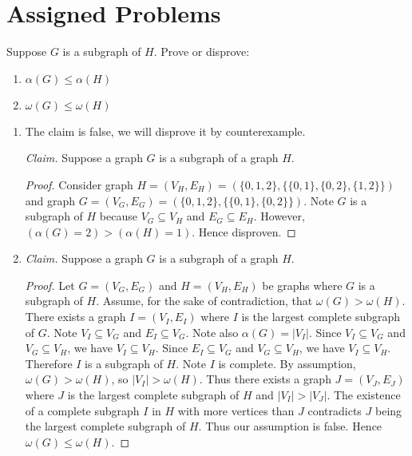 \documentclass{article}
\theoremstyle{definition}
\begin{document}
\section*{Assigned Problems}
\begin{question}
    Suppose $G$ is a subgraph of $H$.  Prove or disprove:
\begin{enumerate}
	\item $\alpha(G) \leq \alpha(H)$
	\item $\omega(G) \leq \omega(H)$
	\end{enumerate}
\end{question}
\begin{solution}
\begin{enumerate}
\item The claim is false, we will disprove it by counterexample.

\textit{Claim. }Suppose a graph $G$ is a subgraph of a graph $H$. 

\begin{proof}
Consider graph $H=(V_H,E_H)=(\{0,1,2\},\{\{0,1\},\{0,2\},\{1,2\}\})$ and graph $G=(V_G,E_G)=(\{0,1,2\},\{\{0,1\},\{0,2\}\})$. Note $G$ is a subgraph of $H$ because $V_G\subseteq V_H$ and $E_G\subseteq E_H$. However, $(\alpha(G)=2)>(\alpha(H)=1)$. Hence disproven.  
\end{proof}
\item\textit{Claim. }Suppose a graph $G$ is a subgraph of a graph $H$.
\begin{proof}
Let $G=(V_G,E_G)$ and $H=(V_H,E_H)$ be graphs where $G$ is a subgraph of $H$. Assume, for the sake of contradiction, that $\omega(G)>\omega(H)$. There exists a graph $I=(V_I,E_I)$ where $I$ is the largest complete subgraph of $G$. Note $V_I\subseteq V_G$ and $E_I\subseteq V_G$. Note also $\alpha(G)=|V_I|$. Since $V_I\subseteq V_G$ and $V_G\subseteq V_H$, we have $V_I\subseteq V_H$. Since $E_I\subseteq V_G$ and $V_G\subseteq V_H$, we have $V_I\subseteq V_H$. Therefore $I$ is a subgraph of $H$. Note $I$ is complete. By assumption, $\omega(G)>\omega(H)$, so $|V_I|>\omega(H)$. Thus there exists a graph $J=(V_J,E_J)$ where $J$ is the largest complete subgraph of $H$ and $|V_I|>|V_J|$. The existence of a complete subgraph $I$ in $H$ with more vertices than $J$ contradicts $J$ being the largest complete subgraph of $H$. Thus our assumption is false. Hence $\omega(G)\leq\omega(H)$.
\end{proof}
\end{enumerate}
\end{solution}
\end{document}
